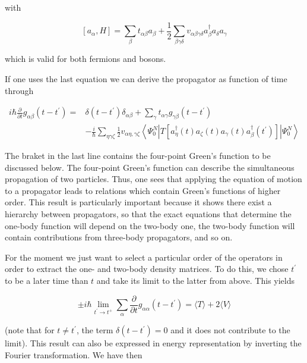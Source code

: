 {with

$$
\left[a_{\alpha}, H\right]=\sum_{\beta} t_{\alpha \beta} a_{\beta}+\frac{1}{2} \sum_{\beta \gamma \delta} v_{\alpha \beta \gamma \delta} a_{\beta}^{\dagger} a_{\delta} a_{\gamma}
$$

which is valid for both fermions and bosons.



If one uses the last equation we can derive the propagator as function of time through

\[
\begin{aligned}
i \hbar \frac{\partial}{\partial t} g_{\alpha \beta}\left(t-t^{\prime}\right)= & \delta\left(t-t^{\prime}\right) \delta_{\alpha \beta}+\sum_{\gamma} t_{\alpha \gamma} g_{\gamma \beta}\left(t-t^{\prime}\right) \\
& -\frac{i}{\hbar} \sum_{\eta \gamma \zeta} \frac{1}{2} v_{\alpha \eta, \gamma \zeta}\left\langle\Psi_{0}^{N}\left|T\left[a_{\eta}^{\dagger}(t) a_{\zeta}(t) a_{\gamma}(t) a_{\beta}^{\dagger}\left(t^{\prime}\right)\right]\right| \Psi_{0}^{N}\right\rangle
\end{aligned}
\]


The braket in the last line contains the four-point Green's function to be discussed below.
The four-point Green's function can describe the simultaneous propagation of
two particles. Thus, one sees that applying the equation of motion to
a propagator leads to relations which contain Green's functions of
higher order. This result is particularly important because it shows
there exist a hierarchy between propagators, so that the exact
equations that determine the one-body function will depend on the
two-body one, the two-body function will contain contributions from
three-body propagators, and so on.

For the moment we just want to select a particular order of the
operators in order to extract the one- and two-body
density matrices. To do this, we chose $t^{\prime}$ to be a later time
than $t$ and take its limit to the latter from above. This yields

$$
\pm i \hbar \lim _{t^{\prime} \rightarrow t^{+}} \sum_{\alpha} \frac{\partial}{\partial t} g_{\alpha \alpha}\left(t-t^{\prime}\right)=\langle T\rangle+2\langle V\rangle
$$

(note that for $t \neq t^{\prime}$, the term
$\delta\left(t-t^{\prime}\right)=0$ and it does not contribute to the
limit). This result can also be expressed in energy representation by
inverting the Fourier transformation. We have then

}
